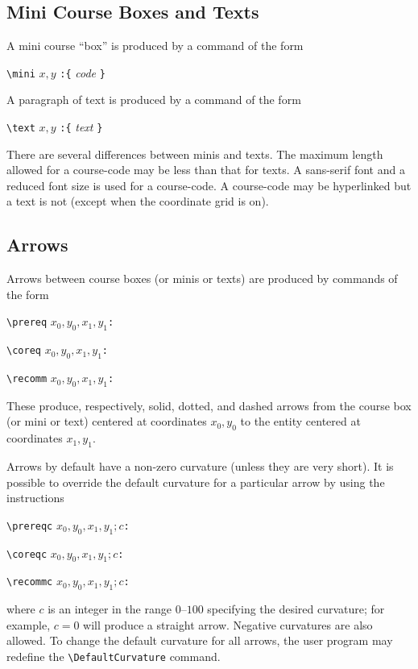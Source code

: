 \documentclass[11pt]{article}
\begin{document}
\subsection{Mini Course Boxes and Texts}
A mini course ``box'' is produced by a command of the form
\begin{list}{}{}
\item \verb|\mini| $x,y$ \verb|:{| \emph{code} \verb|}|
\end{list}
A paragraph of text is produced by a command of the form
\begin{list}{}{}
\item \verb|\text| $x,y$ \verb|:{| \emph{text} \verb|}|
\end{list}
There are several differences between minis and texts.
The maximum length allowed for a course-code may be less than that
for texts. A sans-serif font and a reduced font size is
used for a course-code.  A course-code
may be hyperlinked but a text is not (except when the coordinate grid is on).


\subsection{Arrows}
Arrows between course boxes (or minis or texts) are produced
by commands of the form
\begin{list}{}{}
\item \verb|\prereq| $ x_0,y_0,x_1,y_1$\verb|:|
\item \verb|\coreq| $ x_0,y_0,x_1,y_1$\verb|:|
\item \verb|\recomm| $ x_0,y_0,x_1,y_1$\verb|:|
\end{list}
These produce, respectively, solid, dotted, and dashed arrows from
the course box (or mini or text) centered at coordinates
$x_0,y_0$
to the entity centered at coordinates
$x_1,y_1$.

Arrows by default have a
non-zero curvature (unless they are very short).  It is possible to override the default curvature 
for a particular arrow by using
the instructions
\begin{list}{}{}
\item \verb|\prereqc| $ x_0,y_0,x_1,y_1;c$\verb|:|
\item \verb|\coreqc| $ x_0,y_0,x_1,y_1;c$\verb|:|
\item \verb|\recommc| $ x_0,y_0,x_1,y_1;c$\verb|:|
\end{list}
where
$c$
is an integer in the range $0$--$100$ specifying the desired curvature; for example, 
$c= 0$
will produce a 
straight 
arrow. Negative curvatures are also allowed.
To change the default curvature for all arrows, the user program may redefine the
\verb|\DefaultCurvature|
command.
\end{document}
